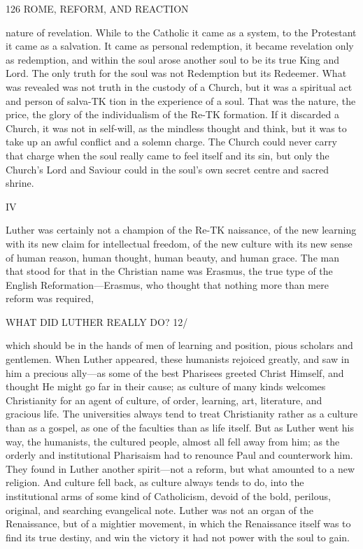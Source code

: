 \documentclass[12pt,a5paper,oneside]{book}
\begin{document}
126 ROME, REFORM, AND REACTION 

nature of revelation. While to the Catholic it came 
as a system, to the Protestant it came as a salvation. 
It came as personal redemption, it became revelation 
only as redemption, and within the soul arose another 
soul to be its true King and Lord. The only truth 
for the soul was not Redemption but its Redeemer. 
What was revealed was not truth in the custody of a 
Church, but it was a spiritual act and person of salva-TK
tion in the experience of a soul. That was the nature, 
the price, the glory of the individualism of the Re-TK
formation. If it discarded a Church, it was not in 
self-will, as the mindless thought and think, but it 
was to take up an awful conflict and a solemn charge. 
The Church could never carry that charge when the 
soul really came to feel itself and its sin, but only 
the Church's Lord and Saviour could in the soul's 
own secret centre and sacred shrine. 

IV 

Luther was certainly not a champion of the Re-TK
naissance, of the new learning with its new claim for 
intellectual freedom, of the new culture with its new 
sense of human reason, human thought, human 
beauty, and human grace. The man that stood for 
that in the Christian name was Erasmus, the true type 
of the English Reformation---Erasmus, who thought 
that nothing more than mere reform was required, 



WHAT DID LUTHER REALLY DO? 12/ 

which should be in the hands of men of learning and 
position, pious scholars and gentlemen. When Luther 
appeared, these humanists rejoiced greatly, and saw in 
him a precious ally---as some of the best Pharisees 
greeted Christ Himself, and thought He might go far 
in their cause; as culture of many kinds welcomes 
Christianity for an agent of culture, of order, learning, 
art, literature, and gracious life. The universities 
always tend to treat Christianity rather as a culture 
than as a gospel, as one of the faculties than as life 
itself. But as Luther went his way, the humanists, 
the cultured people, almost all fell away from him; 
as the orderly and institutional Pharisaism had to 
renounce Paul and counterwork him. They found 
in Luther another spirit---not a reform, but what 
amounted to a new religion. And culture fell back, 
as culture always tends to do, into the institutional 
arms of some kind of Catholicism, devoid of the bold, 
perilous, original, and searching evangelical note. 
Luther was not an organ of the Renaissance, but of 
a mightier movement, in which the Renaissance itself 
was to find its true destiny, and win the victory it 
had not power with the soul to gain. 
\end{document}
